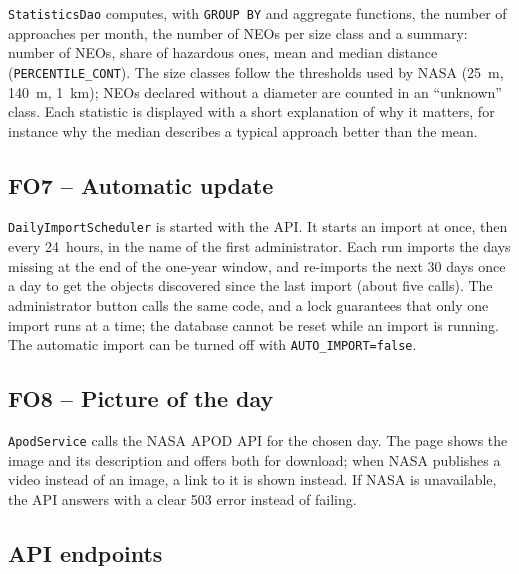 \texttt{StatisticsDao} computes, with \texttt{GROUP BY} and aggregate functions, the number of
approaches per month, the number of NEOs per size class and a summary: number of NEOs, share of
hazardous ones, mean and median distance (\texttt{PERCENTILE\_CONT}). The size classes follow the
thresholds used by NASA (25~m, 140~m, 1~km); NEOs declared without a diameter are counted in an
``unknown'' class. Each statistic is displayed with a short explanation of why it matters, for
instance why the median describes a typical approach better than the mean.

\subsection{FO7 -- Automatic update}

\texttt{DailyImportScheduler} is started with the API. It starts an import at once, then every
24~hours, in the name of the first administrator. Each run imports the days missing at the end of
the one-year window, and re-imports the next 30 days once a day to get the objects discovered
since the last import (about five calls). The administrator button calls the same code, and a
lock guarantees that only one import runs at a time; the database cannot be reset while an import
is running. The automatic import can be turned off with \texttt{AUTO\_IMPORT=false}.

\subsection{FO8 -- Picture of the day}

\texttt{ApodService} calls the NASA APOD API for the chosen day. The page shows the image and its
description and offers both for download; when NASA publishes a video instead of an image, a link
to it is shown instead. If NASA is unavailable, the API answers with a clear 503 error instead of
failing.

\subsection{API endpoints}

